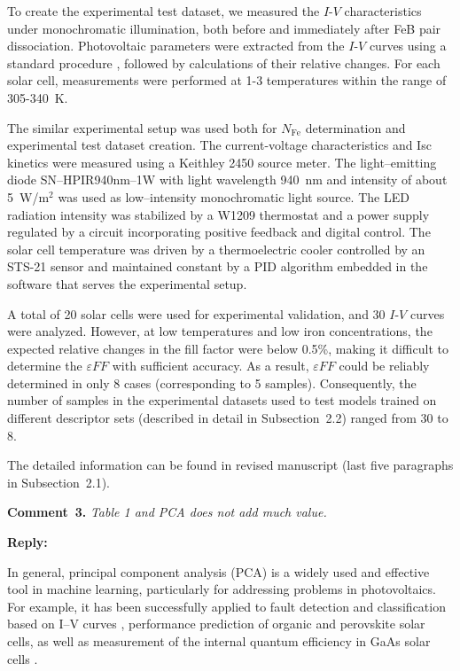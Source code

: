 \documentclass[a4paper,fleqn]{cas-sc}
\begin{document}
To create the experimental test dataset, we measured the $I$-$V$ characteristics under monochromatic illumination,
both before and immediately after FeB pair dissociation.
Photovoltaic parameters were extracted from the $I$-$V$ curves using a standard procedure \cite{SCparam2017},
followed by calculations of their relative changes.
For each solar cell, measurements were performed at 1-3 temperatures within the range of 305-340~K.

The similar experimental setup was used both for $N_\mathrm{Fe}$ determination and experimental test dataset creation.
The current-voltage characteristics and Isc kinetics were measured using a Keithley 2450 source meter.
The light--emitting diode SN--HPIR940nm--1W with light wavelength 940~nm and intensity of about 5~W/m$^{2}$ was used as low--intensity monochromatic light source.
The LED radiation intensity was stabilized by a W1209 thermostat and a power supply regulated by a circuit incorporating positive feedback and digital control.
The solar cell temperature was driven by a thermoelectric cooler controlled by an STS-21 sensor
and maintained constant by a PID algorithm embedded in the software that serves the experimental setup.

A total of 20 solar cells were used for experimental validation, and 30 $I$-$V$ curves were analyzed.
However, at low temperatures and low iron concentrations,
the expected relative changes in the fill factor were below 0.5\%,
making it difficult to determine the $\varepsilon F\!F$ with sufficient accuracy.
As a result, $\varepsilon F\!F$ could be reliably determined in only 8 cases (corresponding to 5 samples).
Consequently, the number of samples in the experimental datasets used to test models trained on different descriptor sets
(described in detail in Subsection~2.2) ranged from 30 to 8.

The detailed information can be found in revised manuscript (last five paragraphs in Subsection~2.1).



\vspace{1cm}
\noindent
\textcolor[rgb]{0.00,0.50,1.00}{\textbf{Comment~3.}}
\emph{Table 1 and PCA does not add much value.}

\noindent
\textcolor[rgb]{0.51,0.00,0.00}{\textbf{Reply:}}

In general, principal component analysis (PCA) is a widely used and effective tool in machine learning,
particularly for addressing problems in photovoltaics.
For example, it has been successfully applied to fault detection and classification based on I–V curves \cite{Fadhel2019, Gao2020},
performance prediction of organic \cite{David2021} and perovskite \cite{Liu2022} solar cells,
as well as measurement of the internal quantum efficiency in GaAs solar cells \cite{AbdullahVetter2025}.
\end{document}
